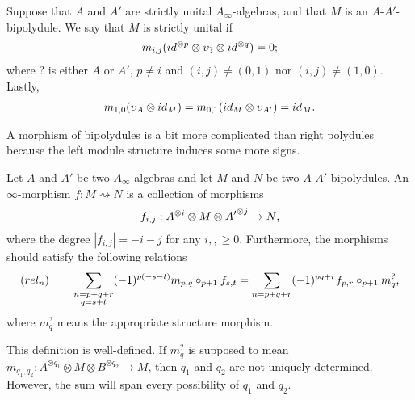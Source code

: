 \documentclass[../thesis.tex]{subfiles}
\begin{document}
            \begin{definition}
                Suppose that $A$ and $A'$ are strictly unital $A_\infty$-algebras, and that $M$ is an $A$-$A'$-bipolydule. We say that $M$ is strictly unital if
                \begin{align*}
                    m_{i,j}(id^{\otimes p} \otimes \upsilon_? \otimes id^{\otimes q}) = 0\tt{;}
                \end{align*}
                where $?$ is either $A$ or $A'$, $p \neq i$ and $(i,j) \neq (0,1)$ nor $(i,j) \neq (1,0)$. Lastly,
                \begin{align*}
                    m_{1,0}(\upsilon_A \otimes id_M) = m_{0,1}(id_M \otimes \upsilon_{A'}) = id_M\tt{.}
                \end{align*}
            \end{definition}

            A morphism of bipolydules is a bit more complicated than right polydules because the left module structure induces some more signs.
            
            \begin{definition}
                Let $A$ and $A'$ be two $A_\infty$-algebras and let $M$ and $N$ be two $A$-$A'$-bipolydules. An $\infty$-morphism $f : M \rightsquigarrow N$ is a collection of morphisms
                \begin{align*}
                    f_{i,j} : A^{\otimes i} \otimes M \otimes {A'}^{\otimes j} \rightarrow N\tt{,}
                \end{align*}
                where the degree $|f_{i,j}| = -i-j$ for any $i,, \geq 0$. Furthermore, the morphisms should satisfy the following relations
                \begin{align*}
                    (rel_n)\qquad \sum_{\substack{n = p + q + r \\ q = s + t}}(-1)^{p(-s-t)}m_{p,q}\circ_{p+1}f_{s,t} = \sum_{n = p + q + r}(-1)^{pq + r}f_{p,r} \circ_{p+1} m^?_q\tt{,}
                \end{align*}
                where $m^?_q$ means the appropriate structure morphism.
            \end{definition}

            This definition is well-defined. If $m^?_q$ is supposed to mean $m_{q_1,q_2} : A^{\otimes q_1} \otimes M \otimes B^{\otimes q_2} \rightarrow M$, then $q_1$ and $q_2$ are not uniquely determined. However, the sum will span every possibility of $q_1$ and $q_2$.
\end{document}
